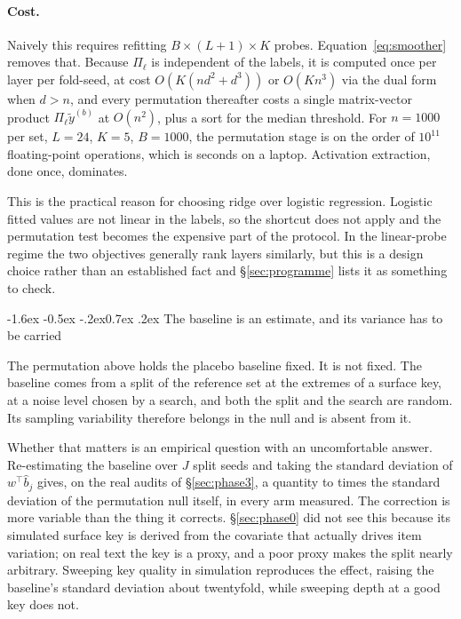 \documentclass[10pt,twocolumn,letterpaper]{article}
\makeatletter
\renewcommand\subsection{\@startsection{subsection}{2}{\z@}%
  {-1.6ex \@plus -0.5ex \@minus -.2ex}{0.7ex \@plus .2ex}%
  {\normalfont\normalsize\bfseries}}
\makeatother
\begin{document}
\paragraph{Cost.} Naively this requires refitting $B\times(L+1)\times K$ probes. Equation~\eqref{eq:smoother} removes that. Because $\Pi_\ell$ is independent of the labels, it is computed once per layer per fold-seed, at cost $O(K(nd^2+d^3))$ or $O(Kn^3)$ via the dual form when $d>n$, and every permutation thereafter costs a single matrix-vector product $\Pi_\ell\tilde y^{(b)}$ at $O(n^2)$, plus a sort for the median threshold. For $n=1000$ per set, $L=24$, $K=5$, $B=1000$, the permutation stage is on the order of $10^{11}$ floating-point operations, which is seconds on a laptop. Activation extraction, done once, dominates.

This is the practical reason for choosing ridge over logistic regression. Logistic fitted values are not linear in the labels, so the shortcut does not apply and the permutation test becomes the expensive part of the protocol. In the linear-probe regime the two objectives generally rank layers similarly, but this is a design choice rather than an established fact and \S\ref{sec:programme} lists it as something to check.

\subsection{The baseline is an estimate, and its variance has to be carried}
\label{sec:basevar}

The permutation above holds the placebo baseline fixed. It is not fixed. The baseline comes from a split of the reference set at the extremes of a surface key, at a noise level chosen by a search, and both the split and the search are random. Its sampling variability therefore belongs in the null and is absent from it.

Whether that matters is an empirical question with an uncomfortable answer. Re-estimating the baseline over $J$ split seeds and taking the standard deviation of $w^{\top}\hat b_j$ gives, on the real audits of \S\ref{sec:phase3}, a quantity \PthreeRatioLo{} to \PthreeRatioHi{} times the standard deviation of the permutation null itself, in every arm measured. The correction is more variable than the thing it corrects. \S\ref{sec:phase0} did not see this because its simulated surface key is derived from the covariate that actually drives item variation; on real text the key is a proxy, and a poor proxy makes the split nearly arbitrary. Sweeping key quality in simulation reproduces the effect, raising the baseline's standard deviation about twentyfold, while sweeping depth at a good key does not.
\end{document}
